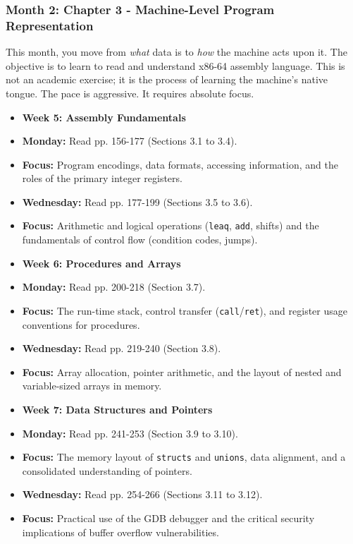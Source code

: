 \documentclass[11pt,a4paper]{report}
\begin{document}
\subsubsection{\textbf{Month 2: Chapter 3 - Machine-Level Program Representation}}

This month, you move from \textit{what} data is to \textit{how} the machine acts upon it. The objective is to learn to read and understand x86-64 assembly language. This is not an academic exercise; it is the process of learning the machine's native tongue. The pace is aggressive. It requires absolute focus.

\begin{itemize}
  \item \textbf{Week 5: Assembly Fundamentals}
  \item \textbf{Monday:} Read pp. 156-177 (Sections 3.1 to 3.4).
  \item \textbf{Focus:} Program encodings, data formats, accessing information, and the roles of the primary integer registers.
  \item \textbf{Wednesday:} Read pp. 177-199 (Sections 3.5 to 3.6).
  \item \textbf{Focus:} Arithmetic and logical operations (\texttt{leaq}, \texttt{add}, shifts) and the fundamentals of control flow (condition codes, jumps).

  \item \textbf{Week 6: Procedures and Arrays}
  \item \textbf{Monday:} Read pp. 200-218 (Section 3.7).
  \item \textbf{Focus:} The run-time stack, control transfer (\texttt{call}/\texttt{ret}), and register usage conventions for procedures.
  \item \textbf{Wednesday:} Read pp. 219-240 (Section 3.8).
  \item \textbf{Focus:} Array allocation, pointer arithmetic, and the layout of nested and variable-sized arrays in memory.

  \item \textbf{Week 7: Data Structures and Pointers}
  \item \textbf{Monday:} Read pp. 241-253 (Section 3.9 to 3.10).
  \item \textbf{Focus:} The memory layout of \texttt{structs} and \texttt{unions}, data alignment, and a consolidated understanding of pointers.
  \item \textbf{Wednesday:} Read pp. 254-266 (Sections 3.11 to 3.12).
  \item \textbf{Focus:} Practical use of the GDB debugger and the critical security implications of buffer overflow vulnerabilities.


\end{itemize}
\end{document}
